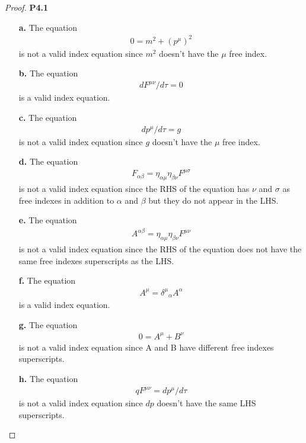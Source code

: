 \documentclass[11pt]{article}
\theoremstyle{definition}
\begin{document}
\begin{proof}{\textbf{P4.1}}
\begin{itemize}
    \item [\bf{a.}] The equation
    \begin{align*}
        0 = m^2 + (p^{\mu})^2
    \end{align*}
    is not a valid index equation since $m^2$ doesn't have the $\mu$ free index.
    \item [\bf{b.}] The equation
    \begin{align*}
        dF^{\mu\nu}/d\tau = 0
    \end{align*}
    is a valid index equation.
    \item [\bf{c.}] The equation
    \begin{align*}
        dp^{\mu}/d\tau = g
    \end{align*}
    is not a valid index equation since $g$ doesn't have the $\mu$ free index.
    \item [\bf{d.}] The equation
    \begin{align*}
        F_{\alpha\beta} = \eta_{\alpha\mu}\eta_{\beta\nu}F^{\mu\sigma}
    \end{align*}
    is not a valid index equation since the RHS of the equation has $\nu$ and
    $\sigma$ as free indexes in addition to $\alpha$ and $\beta$ but they do
    not appear in the LHS.
    \item [\bf{e.}] The equation
    \begin{align*}
        A^{\alpha\beta} = \eta_{\alpha\mu}\eta_{\beta\nu}F^{\mu\nu}
    \end{align*}
    is not a valid index equation since the RHS of the equation does not have
    the same free indexes superscripts as the LHS.
    \item [\bf{f.}] The equation
    \begin{align*}
        A^{\mu} = {\delta^\mu}_\alpha A^\alpha
    \end{align*}
    is a valid index equation.
    \item [\bf{g.}] The equation
    \begin{align*}
        0 = A^\mu + B^\nu
    \end{align*}
    is not a valid index equation since A and B have different free indexes
    superscripts.
    \item [\bf{h.}] The equation
    \begin{align*}
        qF^{\mu\nu} = dp^\mu/d\tau
    \end{align*}
    is not a valid index equation since $dp$ doesn't have the same LHS
    superscripts.
\end{itemize}
\end{proof}
\end{document}
